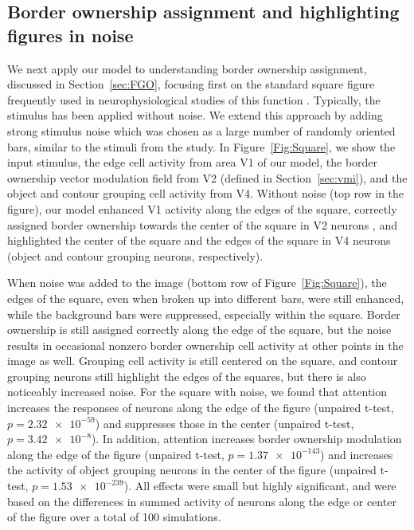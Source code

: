 {%
\subsection{Border ownership assignment and highlighting figures in noise}
\label{sec:BOS}
We next apply our model to understanding border ownership assignment,
discussed in Section~\ref{sec:FGO}, focusing first on the standard square
figure frequently used in neurophysiological studies of this function
\citep{Zhou_etal00,Qiu_etal07,Sugihara_etal11,Williford_vonderHeydt13,Williford_vonderHeydt14,Martin_vonderHeydt15}. Typically, the stimulus has been applied without noise. We extend
this approach by adding strong stimulus noise which was chosen as a
large number of randomly oriented bars, similar to the stimuli from
the \cite{Chen_etal14} study. In Figure~\ref{Fig:Square}, we show the
input stimulus, the edge cell activity from area V1 of our model, the
border ownership vector modulation field from V2 (defined in
Section~\ref{sec:vmi}), 
and the object and contour grouping cell
activity from V4.  Without noise (top row in the figure), our model
enhanced V1 activity along the edges of the square, correctly assigned
border ownership towards the center of the square in V2 neurons
\citep[in agreement with][] {Zhou_etal00}, and highlighted the center
of the square and the edges of the square in V4 neurons (object and
contour grouping neurons, respectively).

When noise was added to the image (bottom row of
Figure~\ref{Fig:Square}), the edges of the square, even when broken up
into different bars, were still enhanced, while the background bars
were suppressed, especially within the square.
Border ownership is still assigned correctly
along the edge of the square, but the noise results in occasional 
nonzero border ownership cell activity at other points in the image as
well. Grouping cell activity is still centered on the square, and
contour grouping neurons still highlight the edges of the squares, but
there is also noticeably increased noise.
For the square with noise, we found that attention increases the
responses of neurons along the edge of the figure (unpaired t-test,
$p=\num{2.32e-59}$) and suppresses those in the center (unpaired
t-test, $p=\num{3.42e-8}$). In addition, attention increases border
ownership modulation along the edge of the figure (unpaired t-test,
$p=\num{1.37e-143}$) and increases the activity of object grouping
neurons in the center of the figure (unpaired t-test,
$p=\num{1.53e-239}$). All effects were small but highly significant,
and were based on the differences in summed activity of neurons along
the edge or center of the figure over a total of 100 simulations.

}
